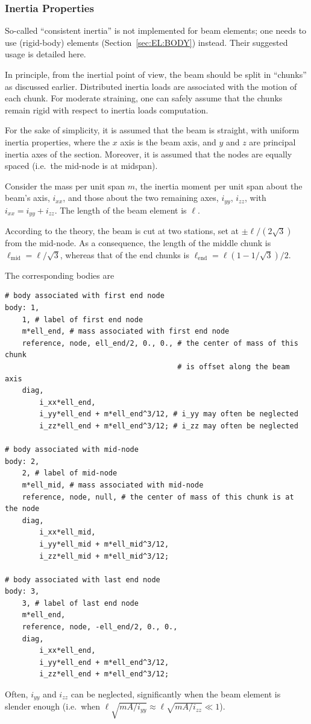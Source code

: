 \subsubsection{Inertia Properties}
So-called ``consistent inertia'' is not implemented for beam elements; one needs to use  (rigid-body) elements 
(Section~\ref{sec:EL:BODY}) instead.
Their suggested usage is detailed here.

In principle, from the inertial point of view, the beam should be split in ``chunks'' as discussed earlier.
Distributed inertia loads are associated with the motion of each chunk.
For moderate straining, one can safely assume that the chunks remain rigid with respect to inertia loads computation.

For the sake of simplicity, it is assumed that the beam is straight, with uniform inertia properties,
where the $x$ axis is the beam axis, and $y$ and $z$ are principal inertia axes of the section.
Moreover, it is assumed that the nodes are equally spaced (i.e.\ the mid-node is at midspan).

Consider the mass per unit span $m$, the inertia moment per unit span about the beam's axis, $i_{xx}$,
and those about the two remaining axes, $i_{yy}$, $i_{zz}$, with $i_{xx} = i_{yy} + i_{zz}$.
The length of the beam element is $\ell$.

According to the theory, the beam is cut at two stations, set at $\pm \ell/(2 \sqrt{3})$ from the mid-node.
As a consequence, the length of the middle chunk is $\ell_{\text{mid}} = \ell/\sqrt{3}$, whereas that of the end chunks is
$\ell_{\text{end}} = \ell (1 - 1/\sqrt{3})/2$.

The corresponding bodies are
\begin{verbatim}
# body associated with first end node
body: 1,
    1, # label of first end node
    m*ell_end, # mass associated with first end node
    reference, node, ell_end/2, 0., 0., # the center of mass of this chunk
                                        # is offset along the beam axis
    diag,
        i_xx*ell_end,
        i_yy*ell_end + m*ell_end^3/12, # i_yy may often be neglected
        i_zz*ell_end + m*ell_end^3/12; # i_zz may often be neglected

# body associated with mid-node
body: 2,
    2, # label of mid-node
    m*ell_mid, # mass associated with mid-node
    reference, node, null, # the center of mass of this chunk is at the node
    diag,
        i_xx*ell_mid,
        i_yy*ell_mid + m*ell_mid^3/12,
        i_zz*ell_mid + m*ell_mid^3/12;

# body associated with last end node
body: 3,
    3, # label of last end node
    m*ell_end,
    reference, node, -ell_end/2, 0., 0.,
    diag,
        i_xx*ell_end,
        i_yy*ell_end + m*ell_end^3/12,
        i_zz*ell_end + m*ell_end^3/12;
\end{verbatim}
Often, $i_{yy}$ and $i_{zz}$ can be neglected, significantly when the beam element is slender enough
(i.e.\ when $\ell \sqrt{m A/i_{yy}} \approx \ell \sqrt{m A/i_{zz}} \ll 1$).

